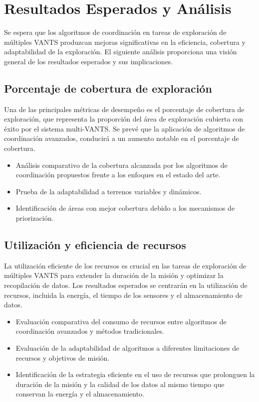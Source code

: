 \documentclass[sigconf]{acmart}
\begin{document}
\section{Resultados Esperados y Análisis}

Se espera que los algoritmos de coordinación en tareas de exploración de múltiples VANTS produzcan mejoras significativas en la eficiencia, cobertura y adaptabilidad de la exploración. El siguiente análisis proporciona una visión general de los resultados esperados y sus implicaciones.

\subsection*{Porcentaje de cobertura de exploración}

Una de las principales métricas de desempeño es el porcentaje de cobertura de exploración, que representa la proporción del área de exploración cubierta con éxito por el sistema multi-VANTS. Se prevé que la aplicación de algoritmos de coordinación avanzados, conducirá a un aumento notable en el porcentaje de cobertura.

\begin{itemize}
\item Análisis comparativo de la cobertura alcanzada por los algoritmos de coordinación propuestos frente a los enfoques en el estado del arte.
\item Prueba de la adaptabilidad a terrenos variables y dinámicos.
\item Identificación de áreas con mejor cobertura debido a los mecanismos de priorización.
\end{itemize}
  
\subsection*{Utilización y eficiencia de recursos}

La utilización eficiente de los recursos es crucial en las tareas de exploración de múltiples VANTS para extender la duración de la misión y optimizar la recopilación de datos. Los resultados esperados se centrarán en la utilización de recursos, incluida la energía, el tiempo de los sensores y el almacenamiento de datos.

\begin{itemize}
\item Evaluación comparativa del consumo de recursos entre algoritmos de coordinación avanzados y métodos tradicionales.
  
\item Evaluación de la adaptabilidad de algoritmos a diferentes limitaciones de recursos y objetivos de misión.
  
\item Identificación de la estrategia eficiente en el uso de recursos que prolonguen la duración de la misión y la calidad de los datos al mismo tiempo que conservan la energía y el almacenamiento.
  
\end{itemize}
\end{document}
